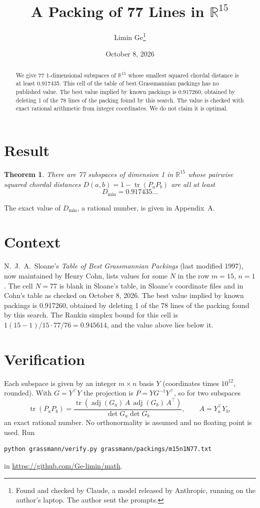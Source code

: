 \documentclass[11pt,a4paper]{article}
\title{A Packing of 77 Lines in $\mathbb{R}^{15}$}
\author{Limin Ge\thanks{Found and checked by Claude, a model released by Anthropic, running on the author's laptop. The author sent the prompts.}}
\date{October 8, 2026}
\newtheorem*{theorem}{Theorem}
\begin{document}
\maketitle
\begin{abstract}
We give 77 1-dimensional subspaces of $\mathbb{R}^{15}$ whose smallest squared chordal distance is at least 0.917435. This cell of the table of best Grassmannian packings has no published value. The best value implied by known packings is 0.917260, obtained by deleting 1 of the 78 lines of the packing found by this search. The value is checked with exact rational arithmetic from integer coordinates. We do not claim it is optimal.
\end{abstract}

\section{Result}
\begin{theorem}
There are 77 subspaces of dimension 1 in $\mathbb{R}^{15}$ whose pairwise squared chordal distances $D(a,b) = 1 - \operatorname{tr}(P_aP_b)$ are all at least
\[ D_{\min} = 0.917435\ldots \]
\end{theorem}
The exact value of $D_{\min}$, a rational number, is given in Appendix~A.


\section{Context}
N.~J.~A.~Sloane's \emph{Table of Best Grassmannian Packings} (last modified 1997), now maintained by Henry Cohn, lists values for some $N$ in the row $m=15$, $n=1$. The cell $N=77$ is blank in Sloane's table, in Sloane's coordinate files and in Cohn's table as checked on October 8, 2026. The best value implied by known packings is 0.917260, obtained by deleting 1 of the 78 lines of the packing found by this search. The Rankin simplex bound for this cell is $1(15-1)/15\cdot 77/76 = 0.945614$, and the value above lies below it.


\section{Verification}
Each subspace is given by an integer $m\times n$ basis $Y$ (coordinates times $10^{12}$, rounded). With $G=Y^\top Y$ the projection is $P=YG^{-1}Y^\top$, so for two subspaces
\[ \operatorname{tr}(P_aP_b)=\frac{\operatorname{tr}(\operatorname{adj}(G_a)\,A\,\operatorname{adj}(G_b)\,A^\top)}{\det G_a\det G_b},\qquad A=Y_a^\top Y_b, \]
an exact rational number. No orthonormality is assumed and no floating point is used. Run
\begin{verbatim}
python grassmann/verify.py grassmann/packings/m15n1N77.txt
\end{verbatim}
in \url{https://github.com/Ge-limin/math}.
\end{document}
